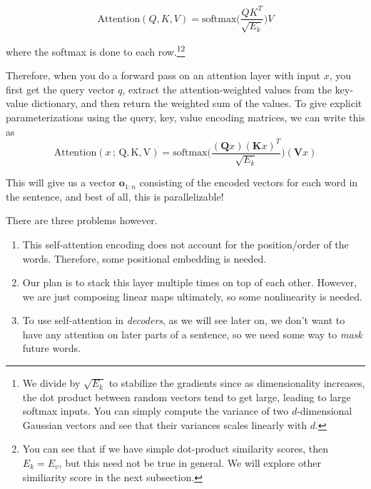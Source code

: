 \documentclass{article}
\begin{document}
\begin{definition}
        \begin{equation} 
          \mathrm{Attention}(Q, K, V) = \mathrm{softmax} \bigg( \frac{Q K^T}{\sqrt{E_k}} \bigg) V
        \end{equation}

        where the softmax is done to each row.\footnote{We divide by $\sqrt{E_k}$ to stabilize the gradients since as dimensionality increases, the dot product between random vectors tend to get large, leading to large softmax inputs. You can simply compute the variance of two $d$-dimensional Gaussian vectors and see that their variances scales linearly with $d$. }\footnote{You can see that if we have simple dot-product similarity scores, then $E_k = E_v$, but this need not be true in general. We will explore other similiarity score in the next subsection. } 

        Therefore, when you do a forward pass on an attention layer with input $x$, you first get the query vector $q$, extract the attention-weighted values from the key-value dictionary, and then return the weighted sum of the values. To give explicit parameterizations using the query, key, value encoding matrices, we can write this as 
        \begin{equation} 
          \mathrm{Attention}(x \,;\, \mathrm{Q}, \mathrm{K}, \mathrm{V}) = \mathrm{softmax} \bigg( \frac{(\mathbf{Q}x)(\mathbf{K} x)^T}{\sqrt{E_k}} \bigg) (\mathbf{V} x)
        \end{equation}

        This will give us a vector $\mathbf{o}_{1:n}$ consisting of the encoded vectors for each word in the sentence, and best of all, this is parallelizable! 
      \end{definition}

      There are three problems however. 
      \begin{enumerate}
        \item This self-attention encoding does not account for the position/order of the words. Therefore, some positional embedding is needed. 
        \item Our plan is to stack this layer multiple times on top of each other. However, we are just composing linear maps ultimately, so some nonlinearity is needed. 
        \item To use self-attention in \textit{decoders}, as we will see later on, we don't want to have any attention on later parts of a sentence, so we need some way to \textit{mask} future words. 
      \end{enumerate}
\end{document}
